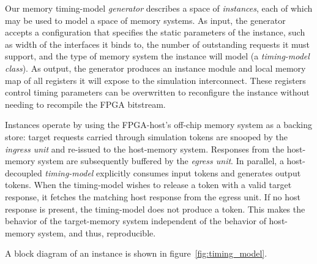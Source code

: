 
Our memory timing-model \textit{generator} describes a space of
\textit{instances}, each of which may be used to model a space of
memory systems. As input, the generator accepts a configuration that specifies
the static parameters of the instance,  such as width of the interfaces it
binds to, the number of outstanding requests it must support, and the type of
memory system the instance will model (a \emph{timing-model class}). As output,
the generator produces an instance module and local memory map of all registers
it will expose to the simulation interconnect. These registers control timing
parameters can be overwritten to reconfigure the instance without needing to
recompile the FPGA bitstream.

Instances operate by using the FPGA-host's off-chip memory system as a backing
store: target requests carried through simulation tokens are snooped by the
\emph{ingress unit} and re-issued to the host-memory system. Responses from the
host-memory system are subsequently buffered by the \emph{egress unit}. In
parallel, a host-decoupled \emph{timing-model} explicitly consumes input tokens
and generates output tokens. When the timing-model wishes to release a token
with a valid target response, it fetches the matching host response from the
egress unit. If no host response is present, the timing-model does not produce
a token. This makes the behavior of the target-memory system independent of the
behavior of host-memory system, and thus, reproducible.

A block diagram of an instance is shown in figure~\ref{fig:timing_model}.


